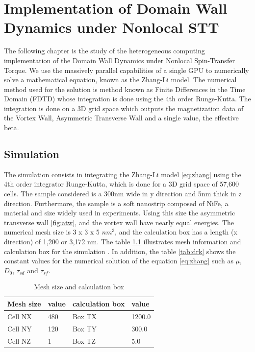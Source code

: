 
\chapter{Implementation of Domain Wall Dynamics under Nonlocal STT} %

\label{Implementation of Domain Wall Dynamics under Nonlocal STT} %


The following chapter is the study of the heterogeneous computing implementation of the Domain Wall Dynamics under Nonlocal Spin-Transfer Torque. We use the massively parallel capabilities of a single GPU to numerically solve a mathematical equation, known as the Zhang-Li model. The numerical method used for the solution is method known as Finite Differences in the Time Domain (FDTD) whose integration is done using the 4th order Runge-Kutta. The integration is done on a 3D grid space which outputs the magnetization data of the Vortex Wall, Asymmetric Transverse Wall and a single value, the effective beta.

\section{Simulation}

The simulation consists in integrating the Zhang-Li model \ref{eq:zhang} using the 4th order integrator Runge-Kutta, which is done for a 3D grid space of 57,600 cells. The sample considered is a 300nm wide in y direction and 5nm thick in z direction. Furthermore, the sample is a soft nanostrip composed of NiFe, a material and size widely used in experiments. Using this size the asymmetric transverse wall \ref{fig:atw}, and the vortex wall have nearly equal energies. The numerical mesh size is 3 x 3 x 5 $nm^3$, and the calculation box has a length (x direction) of 1,200 or 3,172 nm. The table \ref{tab:mesh} illustrates mesh information and calculation box for the simulation \cite{claudio}. In addition, the table \ref{tab:drk} shows the constant values for the numerical solution of the equation \ref{eq:zhang} such as $\mu$, $D_{0}$, $\tau_{sd}$ and $\tau_{sf}$.

\begin{table}[h]
\centering
\begin{tabular}{| l | l | l | l |}
\hline
Mesh size & value & calculation box & value \\
\hline
Cell NX & 480 & Box TX  & 1200.0   \\
\hline
Cell NY & 120 & Box TY  & 300.0  \\
\hline
Cell NZ &	1 & Box TZ  & 5.0   \\
\hline
\end{tabular}
\caption{Mesh size and calculation box}
\label{tab:mesh}
\end{table}

